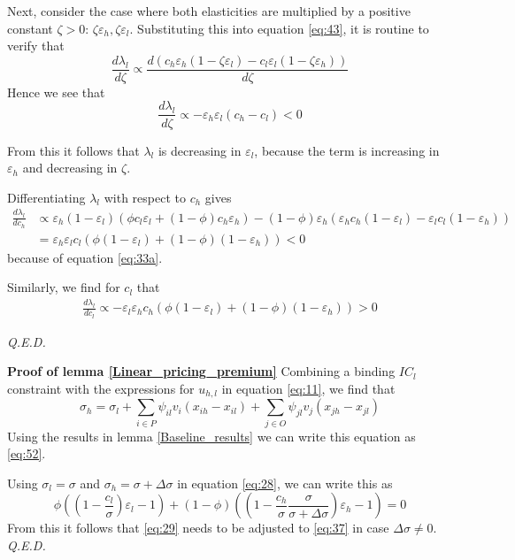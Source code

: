 \documentclass[a4paper,12pt]{article}
\newcommand{\qed}{\hspace*{\fill} {\em Q.E.D.}}
\begin{document}
Next, consider the case where both elasticities are multiplied by a positive constant \(\zeta>0\): \(\zeta \varepsilon_{h} ,\zeta \varepsilon_{l}\). Substituting this into equation \eqref{eq:43}, it is routine to verify that
\begin{equation}
\label{eq:32}
\frac{d \lambda_l}{d \zeta} \propto \frac{d(c_h \varepsilon_h (1- \zeta \varepsilon_l )-c_l \varepsilon_l(1-\zeta \varepsilon_h))}{d \zeta}
\end{equation}
Hence we see that
\begin{equation}
\label{eq:35}
\frac{d \lambda_l}{d \zeta} \propto - \varepsilon_h \varepsilon_l (c_h-c_l) < 0
\end{equation}

From this it follows that \(\lambda_l\) is decreasing in \(\varepsilon_l\), because the term is increasing in \(\varepsilon_h\) and decreasing in \(\zeta\).

Differentiating \(\lambda_l\) with respect to \(c_h\) gives
\begin{align*}
\frac{d \lambda_l}{d c_h} &\propto \varepsilon_h (1-\varepsilon_l)(\phi c_l\varepsilon_l+(1-\phi)c_h \varepsilon_h) - (1-\phi) \varepsilon_h (\varepsilon_h c_h (1-\varepsilon_l) - \varepsilon_l c_l (1-\varepsilon_h)) \\
 &= \varepsilon_h \varepsilon_l c_l (\phi(1-\varepsilon_l)+(1-\phi)(1-\varepsilon_h)) <0
\end{align*}
because of equation \eqref{eq:33a}.

Similarly, we find for \(c_l\) that
\begin{align*}
\frac{d \lambda_l}{d c_l} \propto -\varepsilon_l \varepsilon_h c_h (\phi (1-\varepsilon_l) + (1-\phi) (1-\varepsilon_h)) >0
\end{align*}

 \qed

\textbf{Proof of lemma \ref{Linear_pricing_premium}}
Combining a binding \(IC_l\) constraint with the expressions for \(u_{h,l}\) in equation \eqref{eq:11}, we find that
\begin{equation}
\label{eq:53}
\sigma_h = \sigma_l + \sum_{i \in P} \psi_{il}v_i (x_{ih}-x_{il}) + \sum_{j \in O} \psi_{jl} v_j (x_{jh}-x_{jl})
\end{equation}
Using the results in lemma \ref{Baseline_results} we can write this equation as \eqref{eq:52}.

Using \(\sigma_l=\sigma\) and \(\sigma_h=\sigma+\Delta\sigma\) in equation \eqref{eq:28}, we can write this as
\begin{equation}
\label{eq:54}
\phi \left( (1 -\frac{c_l}{\sigma})\varepsilon_l -1 \right) + (1-\phi) \left( (1 - \frac{c_h}{\sigma} \frac{\sigma}{\sigma + \Delta \sigma}) \varepsilon_h -1  \right) = 0
\end{equation}
From this it follows that \eqref{eq:29} needs to be adjusted to \eqref{eq:37} in case \(\Delta \sigma \neq 0\). 
 \qed
\end{document}
